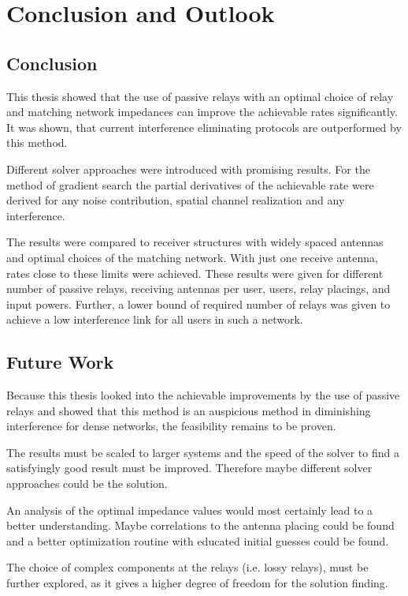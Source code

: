 \chapter{Conclusion and Outlook}

\section{Conclusion}
\label{sec:conclusion}
This thesis showed that the use of passive relays with an optimal choice of relay and matching network impedances can improve the achievable rates significantly.
It was shown, that current interference eliminating protocols are outperformed by this method.

Different solver approaches were introduced with promising results.
For the method of gradient search the partial derivatives of the achievable rate were derived for any noise contribution, spatial channel realization and any interference.

The results were compared to receiver structures with widely spaced antennas and optimal choices of the matching network.
With just one receive antenna, rates close to these limits were achieved.
These results were given for  different number of passive relays, receiving antennas per user, users, relay placings, and input powers.
Further, a lower bound of required number of relays was given to achieve a low interference link for all users in such a network.


\section{Future Work}
\label{sec:outlook}
Because this thesis looked into the achievable improvements by the use of passive relays and showed that this method is an auspicious method in diminishing interference for dense networks, the feasibility remains to be proven.

The results must be scaled to larger systems and the speed of the solver to find a satisfyingly good result must be improved.
Therefore maybe different solver approaches could be the solution.

An analysis of the optimal impedance values would most certainly lead to a better understanding.
Maybe correlations to the antenna placing could be found and a better optimization routine with educated initial guesses could be found.

The choice of complex components at the relays (i.e. lossy relays), must be further explored, as it gives a higher degree of freedom for the solution finding.
